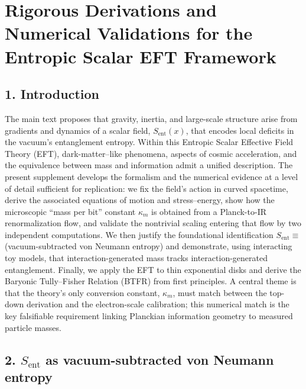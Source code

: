 \documentclass[11pt]{article}
\begin{document}
\appendix
\section*{Rigorous Derivations and Numerical Validations for the Entropic Scalar EFT Framework}

\subsection*{1. Introduction}

The main text proposes that gravity, inertia, and large-scale structure arise from gradients and dynamics of a scalar field, $S_{\mathrm{ent}}(x)$, that encodes local deficits in the vacuum’s entanglement entropy. Within this Entropic Scalar Effective Field Theory (EFT), dark-matter–like phenomena, aspects of cosmic acceleration, and the equivalence between mass and information admit a unified description. The present supplement develops the formalism and the numerical evidence at a level of detail sufficient for replication: we fix the field’s action in curved spacetime, derive the associated equations of motion and stress–energy, show how the microscopic “mass per bit” constant $\kappa_m$ is obtained from a Planck-to-IR renormalization flow, and validate the nontrivial scaling entering that flow by two independent computations. We then justify the foundational identification $S_{\mathrm{ent}} \equiv$ (vacuum-subtracted von Neumann entropy) and demonstrate, using interacting toy models, that interaction-generated mass tracks interaction-generated entanglement. Finally, we apply the EFT to thin exponential disks and derive the Baryonic Tully–Fisher Relation (BTFR) from first principles. A central theme is that the theory’s only conversion constant, $\kappa_m$, must match between the top-down derivation and the electron-scale calibration; this numerical match is the key falsifiable requirement linking Planckian information geometry to measured particle masses.

\subsection*{2. $S_{\mathrm{ent}}$ as vacuum-subtracted von Neumann entropy}
\end{document}
